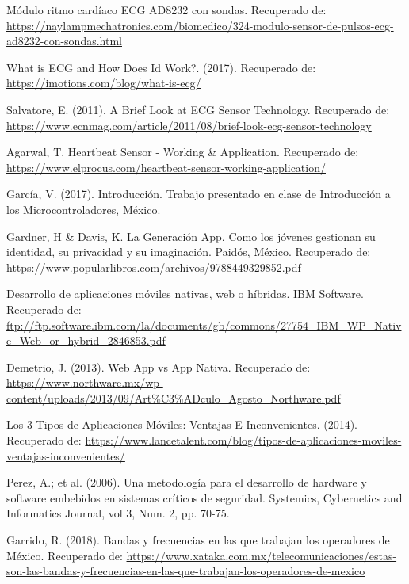 \begin{thebibliography}{0}
	 Módulo ritmo cardíaco ECG AD8232 con sondas. Recuperado de: \url{https://naylampmechatronics.com/biomedico/324-modulo-sensor-de-pulsos-ecg-ad8232-con-sondas.html}
	
	 What is ECG and How Does Id Work?. (2017). Recuperado de: \url{https://imotions.com/blog/what-is-ecg/}
	
	 Salvatore, E. (2011). A Brief Look at ECG Sensor Technology. Recuperado de: \url{https://www.ecnmag.com/article/2011/08/brief-look-ecg-sensor-technology}
	
	 Agarwal, T. Heartbeat Sensor - Working \& Application. Recuperado de: \url{https://www.elprocus.com/heartbeat-sensor-working-application/}
	
	 García, V. (2017). Introducción. Trabajo presentado en clase de Introducción a los Microcontroladores, México.
	
	 Gardner, H \& Davis, K. La Generación App. Como los jóvenes gestionan su identidad, su privacidad y su imaginación. Paidós, México. Recuperado de: \url{https://www.popularlibros.com/archivos/9788449329852.pdf}
	
	 Desarrollo de aplicaciones móviles nativas, web o híbridas. IBM Software. Recuperado de: \url{ftp://ftp.software.ibm.com/la/documents/gb/commons/27754_IBM_WP_Native_Web_or_hybrid_2846853.pdf}
	
	 Demetrio, J. (2013). Web App vs App Nativa. Recuperado de: \url{https://www.northware.mx/wp-content/uploads/2013/09/Art%C3%ADculo_Agosto_Northware.pdf}
		
	 Los 3 Tipos de Aplicaciones Móviles: Ventajas E Inconvenientes. (2014). Recuperado de: \url{https://www.lancetalent.com/blog/tipos-de-aplicaciones-moviles-ventajas-inconvenientes/}
	
	 Perez, A.; et al. (2006). Una metodología para el desarrollo de hardware y software embebidos en sistemas críticos de seguridad. Systemics, Cybernetics and Informatics Journal, vol 3, Num. 2, pp. 70-75.

	 Garrido, R. (2018). Bandas y frecuencias en las que trabajan los operadores de México. Recuperado de: \url{https://www.xataka.com.mx/telecomunicaciones/estas-son-las-bandas-y-frecuencias-en-las-que-trabajan-los-operadores-de-mexico}
	

\end{thebibliography}
